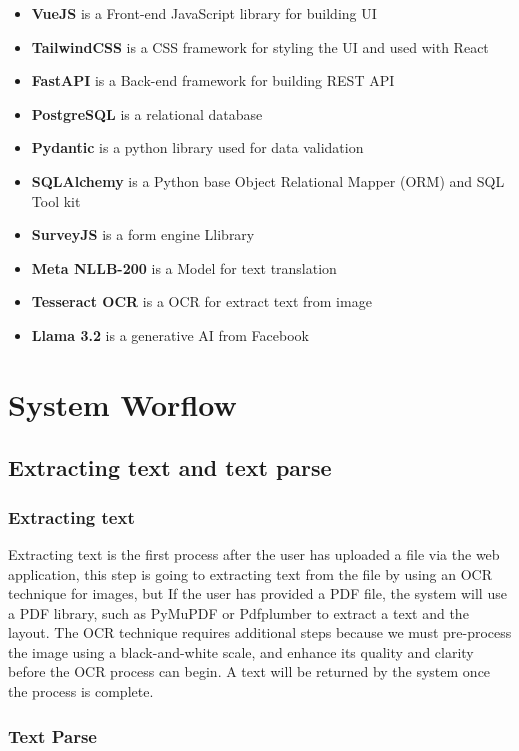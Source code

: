 \documentclass[12pt,oneside,openright,a4paper]{cpe-english-project}
\begin{document}
\begin{itemize}
\item  \textbf{VueJS} is a Front-end JavaScript library for building UI
\item \textbf{TailwindCSS} is a CSS framework for styling the UI and used with React
\item \textbf{FastAPI} is a Back-end framework for building REST API
\item \textbf{PostgreSQL}  is a relational database
\item \textbf{Pydantic}  is a python library used for data validation 
\item \textbf{SQLAlchemy} is a Python base Object Relational Mapper (ORM) and SQL Tool kit
\item \textbf{SurveyJS} is a form engine Llibrary
\item \textbf{Meta NLLB-200} is a Model for text translation
\item \textbf{Tesseract OCR} is a OCR for extract text from image
\item \textbf{Llama 3.2} is a generative AI from Facebook
\end{itemize}


\section{System Worflow}

\subsection{Extracting text and text parse}

\subsubsection{Extracting text}

Extracting text is the first process after the user has uploaded a file via the web application, this step is going to extracting text from the file by using an OCR technique for images, but If the user has provided a PDF file, the system will use a PDF library, such as PyMuPDF or Pdfplumber to extract a text and the layout. The OCR technique requires additional steps because we must pre-process the image using a black-and-white scale, and enhance its quality and clarity before the OCR process can begin. A text will be returned by the system once the process is complete.

\subsubsection{Text Parse}
\end{document}
